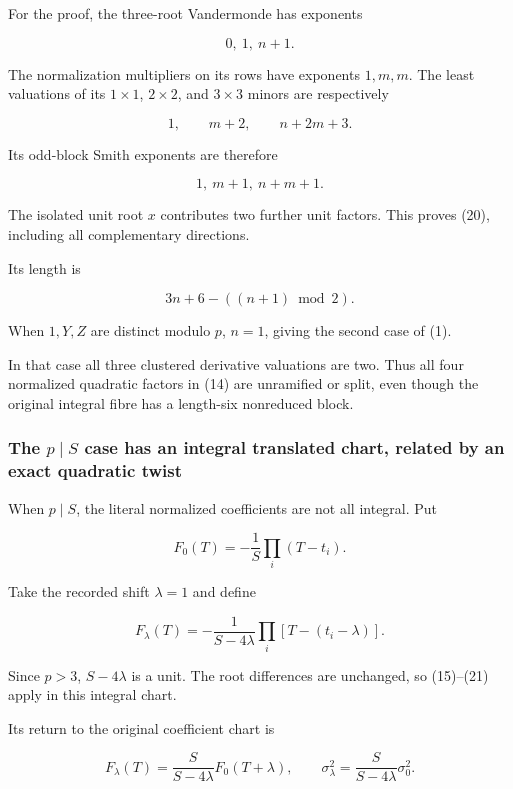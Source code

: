 For the proof, the three-root Vandermonde has exponents

\[
0,\ 1,\ n+1.
\]

The normalization multipliers on its rows have exponents \(1,m,m\). The
least valuations of its \(1\times1\), \(2\times2\), and \(3\times3\)
minors are respectively

\[
1,\qquad m+2,\qquad n+2m+3.
\]

Its odd-block Smith exponents are therefore

\[
1,\ m+1,\ n+m+1.
\]

The isolated unit root \(x\) contributes two further unit factors. This
proves (20), including all complementary directions.

Its length is

\[
\boxed{
3n+6-((n+1)\bmod2).
}
\tag{21}
\]

When \(1,Y,Z\) are distinct modulo \(p\), \(n=1\), giving the second
case of (1).

In that case all three clustered derivative valuations are two. Thus all
four normalized quadratic factors in (14) are unramified or split, even
though the original integral fibre has a length-six nonreduced block.

\subsubsection{\texorpdfstring{The \(p\mid S\) case has an integral
translated chart, related by an exact quadratic
twist}{The p\textbackslash mid S case has an integral translated chart, related by an exact quadratic twist}}\label{the-pmid-s-case-has-an-integral-translated-chart-related-by-an-exact-quadratic-twist}

When \(p\mid S\), the literal normalized coefficients are not all
integral. Put

\[
F_0(T)=-\frac1S\prod_i(T-t_i).
\]

Take the recorded shift \(\lambda=1\) and define

\[
F_\lambda(T)
=
-\frac1{S-4\lambda}
\prod_i[T-(t_i-\lambda)].
\]

Since \(p>3\), \(S-4\lambda\) is a unit. The root differences are
unchanged, so (15)--(21) apply in this integral chart.

Its return to the original coefficient chart is

\[
\boxed{
F_\lambda(T)
=
\frac S{S-4\lambda}F_0(T+\lambda),
\qquad
\sigma_\lambda^2
=
\frac S{S-4\lambda}\sigma_0^2.
}
\tag{22}
\]

